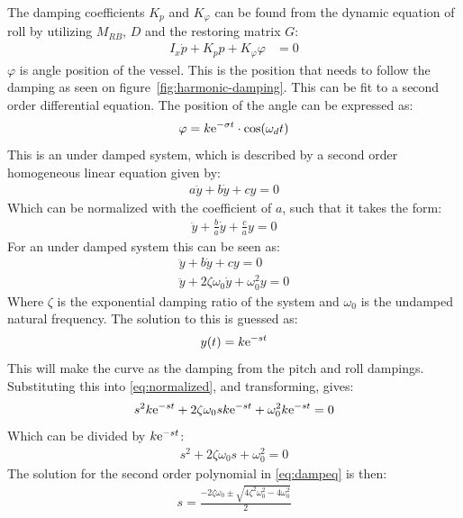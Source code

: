 The damping coefficients $K_p$ and $K_\varphi$ can be found from the dynamic equation
of roll by utilizing $M_{RB}$, $D$ and the restoring matrix $G$:
\begin{align}
I_x\dot p + K_pp + K_\varphi\varphi &= 0
\label{eq:solveddyneq}
\end{align}
$\varphi$ is angle position of the vessel. This is the position that needs to follow the damping as seen on figure~\vref{fig:harmonic-damping}. This can be fit to a second order differential equation. The position of the angle can be expressed as:
\begin{align}
\varphi = k\mathrm{e}^{-\sigma t} \cdot \cos(\omega_d t)
\label{eq:kestcoswt}
\end{align}
This is an under damped system, which is described by a second order
homogeneous linear equation given by:
\begin{align}
a\ddot y + b\dot y + cy = 0
\end{align}
Which can be normalized with the coefficient of $a$, such that it takes the form:
\begin{align}
\ddot y + \frac{b}{a}\dot y + \frac{c}{a}y = 0
\label{eq:parameterized}
\end{align}
For an under damped system this can be seen as:
\begin{align}
\ddot y + b\dot y + cy = 0\\
\ddot y + 2\zeta \omega_0 \dot y + \omega_0^2 y = 0
\label{eq:normalized}
\end{align}
Where $\zeta$ is the exponential damping ratio of the system and $\omega_0$ is the undamped natural frequency. The solution to this is guessed as:
\begin{align}
y(t) = k\mathrm{e}^{-st}
\label{eq:solutionguess}
\end{align}
This will make the curve as the damping from the pitch and roll dampings. Substituting this into \ref{eq:normalized}, and transforming, gives:
\begin{align}
s^2k\mathrm{e}^{-st} + 2\zeta \omega_0sk\mathrm{e}^{-st} + \omega_0^2k\mathrm{e}^{-st} = 0
\end{align}
Which can be divided by $k\mathrm{e}^{-st}$:
\begin{align}
s^2 + 2\zeta \omega_0s + \omega_0^2 = 0
\label{eq:dampeq}
\end{align}
The solution for the second order polynomial in \ref{eq:dampeq} is
then:
\begin{align}
s = \frac{-2\zeta \omega_0 \pm \sqrt{4\zeta^2\omega_0^2-4\omega_0^2}}{2}
\end{align}
